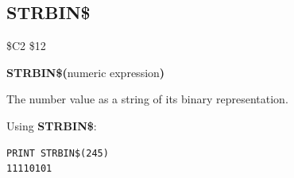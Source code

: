 
\newpage
\subsection{STRBIN\$}
\begin{description}[leftmargin=2cm,style=nextline]
\item [Token:] \$C2 \$12
\item [Format:] {\bf STRBIN\$(}numeric expression{\bf)}
\item [Returns:] The number value as a string of its binary representation.

\item [Example:] Using {\bf STRBIN\$}:
\begin{tcolorbox}[colback=black,coltext=white]
\verbatimfont{\codefont}
\begin{verbatim}
PRINT STRBIN$(245)
11110101
\end{verbatim}
\end{tcolorbox}
\end{description}


\newpage
